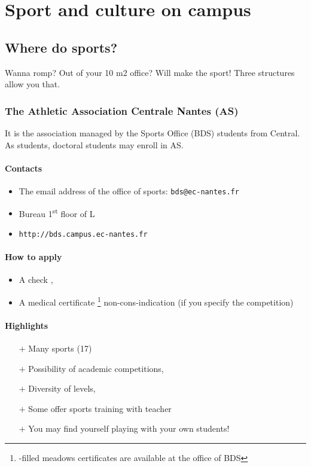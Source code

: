\section{Sport and culture on campus}
\subsection {Where do sports?}
Wanna romp? Out of your 10 m2 office?  Will make the sport! Three structures allow you that.

\subsubsection{The Athletic Association Centrale Nantes (AS)}
It is the association managed by the Sports Office (BDS) students from Central. As students, doctoral students may enroll in AS.
\paragraph{Contacts}
\begin{itemize}
  \item The email address of the office of sports: \texttt{bds@ec-nantes.fr}
  \item Bureau 1\textsuperscript{st} floor of L
  \item \texttt{http://bds.campus.ec-nantes.fr}
\end {itemize}
\paragraph{How to apply}
\begin{itemize}
  \item A check ,
  \item A medical certificate \footnote{-filled meadows certificates are available at the office of BDS} non-cons-indication (if you specify the competition)
\end{itemize}

\paragraph{Highlights}
\begin{itemize}
  \item [$+$] Many sports (17)
  \item [$+$] Possibility of academic competitions,
  \item [$+$] Diversity of levels,
  \item [$+$] Some offer sports training with teacher
  \item [$+$] You may find yourself playing with your own students!
\end{itemize}
